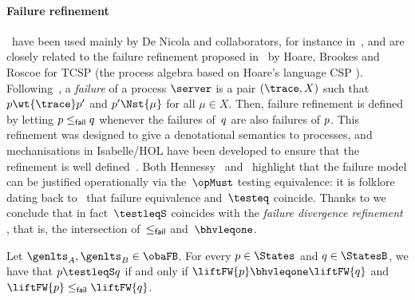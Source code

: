 \paragraph{Failure refinement} %
\MustSets\ have been used mainly
by De Nicola and collaborators, for instance
in~\cite{DBLP:journals/lmcs/NicolaM23,DBLP:journals/iandc/BorealeNP02},
and are closely related to the failure refinement proposed
in~\cite{DBLP:journals/jacm/BrookesHR84} by Hoare, Brookes and Roscoe for TCSP (the process
algebra based on Hoare's language CSP
\cite{DBLP:journals/cacm/Hoare83a,DBLP:conf/icalp/Brookes83}).
Following~\cite{DBLP:journals/jacm/BrookesHR84},  
a {\em failure} of a process $\server$ is a pair $(\trace, X)$
such that $p \wt{ \trace } p'$ and $p' \Nst{\mu}$ for all $\mu \in X$.
Then, failure refinement is defined by letting $p\mathrel{\leq_{\textsf{fail}}}q$
whenever the failures of~$q$ are also failures of $p$.
This refinement was designed to give a denotational semantics to
processes, and mechanisations in Isabelle/HOL have been
developed to ensure that the refinement
is well defined~\cite{HOL-CSP-AFP,DBLP:journals/acta/BaxterRC22}.  Both
Hennessy~\cite[pag. 260]{DBLP:books/daglib/0066919}
and~\cite{Castellan2023}
highlight that the failure
model can be justified operationally via the~$\opMust$ testing
equivalence: it is folklore dating back to~\cite[Section
  4]{DBLP:journals/tcs/NicolaH84} that failure equivalence and~$\testeq$ coincide.
Thanks to  we
conclude that in fact~$\testleqS$ 
coincides with the \emph{failure divergence refinement}
\cite{HOL-CSP}, that is, the intersection of~$\mathrel{\leq_{\textsf{fail}}}$
and~$\bhvleqone$.

\begin{corollary}
  \label{cor:testleqS-equals-failleq}
  Let $\genlts_A, \genlts_B \in \obaFB$.
  For every $\serverA \in \States$  and
  $\serverB \in \StatesB $, we have that
  $\serverA \testleqS \serverB$ if and only if
  $\liftFW{\serverA} \bhvleqone \liftFW{\serverB}$
  and $\liftFW{\serverA} \failleq \liftFW{\serverB}$.
\end{corollary}

